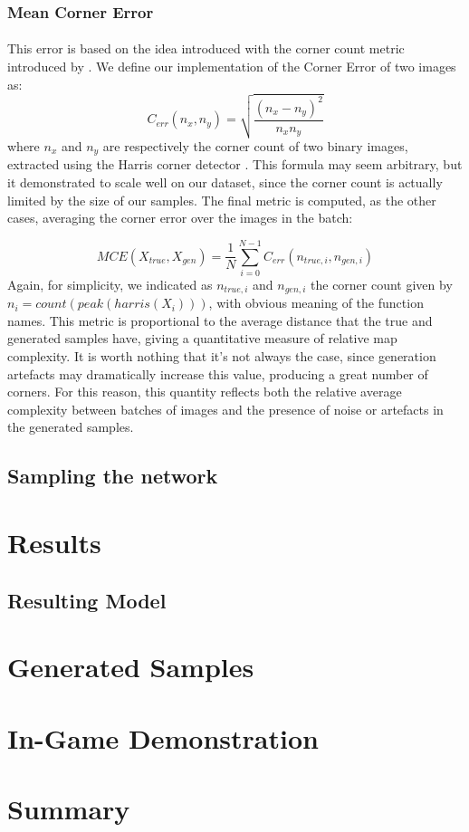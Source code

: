 \subsubsection{Mean Corner Error}
\paragraph{} This error is based on the idea introduced with the corner count metric introduced by \cite{slam}. We define our implementation of the Corner Error of two images as:
\begin{equation}
	C_{err}(n_{x}, n_{y}) = \sqrt{\frac{(n_{x} - n_{y})^2}{n_{x}n_{y}}}
\end{equation}
where $n_{x}$ and $n_{y}$ are respectively the corner count of two binary images, extracted using the Harris corner detector \cite{harrisdetector}.
This formula may seem arbitrary, but it demonstrated to scale well on our dataset, since the corner count is actually limited by the size of our samples. The final metric is computed, as the other cases, averaging the corner error over the images in the batch:

\begin{equation}
MCE(X_{true}, X_{gen}) = \frac{1}{N} \sum_{i=0}^{N-1} C_{err}(n_{true,i}, n_{gen,i})
\end{equation}
Again, for simplicity, we indicated as $ n_{true,i} $ and $ n_{gen,i} $ the corner count given by \\ $ n_{i} = count(peak(harris(X_{i}))) $, with obvious meaning of the function names.
This metric is proportional to the average distance that the true and generated samples have, giving a quantitative measure of relative map complexity. It is worth nothing that it's not always the case, since generation artefacts may dramatically increase this value, producing a great number of corners. For this reason, this quantity reflects both the relative average complexity between batches of images and the presence of noise or artefacts in the generated samples.

\subsection{Sampling the network}



\section{Results}
\label{sec:results}
\subsection{Resulting Model}
\label{sec:sampling}
\section{Generated Samples}
\section{In-Game Demonstration}
\section{Summary}
